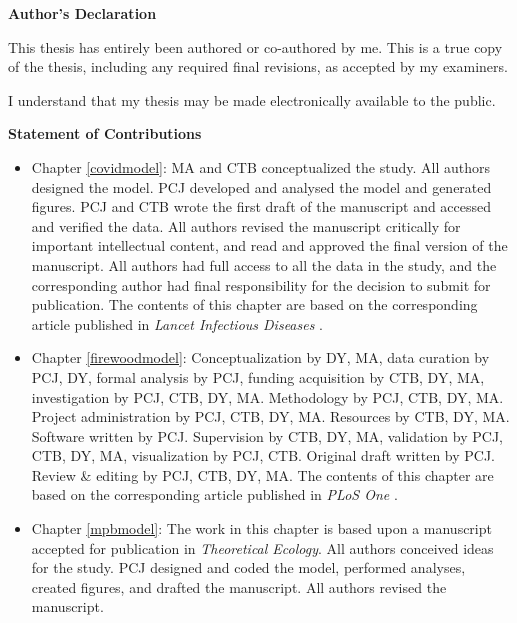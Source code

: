 \cleardoublepage

 \begin{center}\textbf{Author's Declaration}\end{center}
  
 \noindent
This thesis has entirely been authored or co-authored by me. This is a true copy of the thesis, including any required final revisions, as accepted by my examiners.

  \bigskip
  
  \noindent
I understand that my thesis may be made electronically available to the public.

\cleardoublepage

  \begin{center}\textbf{Statement of Contributions}\end{center}
  
  \begin{itemize}
    
   \item Chapter \ref{covidmodel}: MA and CTB conceptualized the study. All authors designed the model. PCJ developed and analysed the model and generated figures. PCJ and CTB wrote the first draft of the manuscript and accessed and verified the data. All authors revised the manuscript critically for important intellectual content, and read and approved the final version of the manuscript. All authors had full access to all the data in the study, and the corresponding author had final responsibility for the decision to submit for publication. The contents of this chapter are based on the corresponding article published in \textit{Lancet Infectious Diseases} \cite{jentsch2021prioritising}.
   
   \item Chapter \ref{firewoodmodel}: Conceptualization by DY, MA, data curation by PCJ, DY, formal analysis by PCJ, funding acquisition by CTB, DY, MA, investigation by PCJ, CTB, DY, MA. Methodology by PCJ, CTB, DY, MA. Project administration by PCJ, CTB, DY, MA. Resources by CTB, DY, MA. Software written by PCJ. Supervision by CTB, DY, MA, validation by PCJ, CTB, DY, MA, visualization by PCJ, CTB. Original draft written by PCJ. Review & editing by PCJ, CTB, DY, MA. The contents of this chapter are based on the corresponding article published in \textit{PLoS One} \cite{jentsch2020go}.

   
   \item Chapter \ref{mpbmodel}: The work in this chapter is based upon a manuscript accepted for publication in \textit{Theoretical Ecology}. All authors conceived ideas for the study. PCJ designed and coded the model, performed
   analyses, created figures, and drafted the manuscript. All authors revised the manuscript.
   

  \end{itemize}
 \cleardoublepage
 
